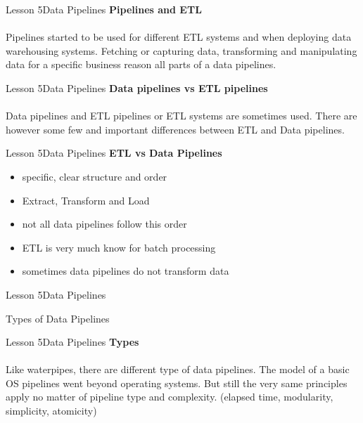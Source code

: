 \documentclass[aspectratio=1610]{beamer}
\begin{document}
\begin{frame}{Lesson 5}{Data Pipelines}
\LARGE
\textbf{Pipelines and ETL}\\~\\
Pipelines started to be used for different ETL systems and when deploying data 
warehousing systems. Fetching or capturing data, transforming and manipulating
data for a specific business reason all parts of a data pipelines.
\end{frame}


\begin{frame}{Lesson 5}{Data Pipelines}
\LARGE
\textbf{Data pipelines vs ETL pipelines}\\~\\
Data pipelines and ETL pipelines or ETL systems are sometimes used. There are
however some few and important differences between ETL and Data pipelines. 
\end{frame}


\begin{frame}{Lesson 5}{Data Pipelines}
\LARGE
\textbf{ETL vs Data Pipelines}\\
\begin{itemize}
	\item specific, clear structure and order
	\item Extract, Transform and Load
	\item not all data pipelines follow this order
	\item ETL is very much know for batch processing
	\item sometimes data pipelines do not transform data
\end{itemize}
\end{frame}


\begin{frame}{Lesson 5}{Data Pipelines}
\Huge
\begin{center}
Types of Data Pipelines
\end{center}
\end{frame}


\begin{frame}{Lesson 5}{Data Pipelines}
\LARGE
\textbf{Types}\\~\\
Like waterpipes, there are different type of data pipelines. The model of a 
basic OS pipelines went beyond operating systems. But still the very same 
principles apply no matter of pipeline type and complexity. (elapsed time, 
modularity, simplicity, atomicity)
\end{frame}
\end{document}
